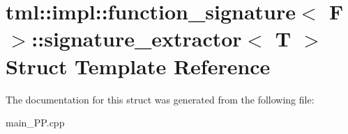 \hypertarget{structtml_1_1impl_1_1function__signature_1_1signature__extractor}{\section{tml\+:\+:impl\+:\+:function\+\_\+signature$<$ F $>$\+:\+:signature\+\_\+extractor$<$ T $>$ Struct Template Reference}
\label{structtml_1_1impl_1_1function__signature_1_1signature__extractor}
}


The documentation for this struct was generated from the following file\+:\begin{DoxyCompactItemize}
\item 
main\+\_\+\+P\+P.\+cpp\end{DoxyCompactItemize}
